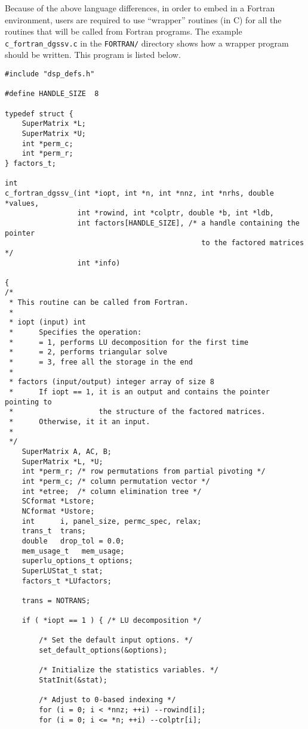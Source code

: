 Because of the above language differences, in order to embed {\superlu}
in a Fortran environment, users are required to use ``wrapper'' routines
(in C) for all the {\superlu} routines that will be called from Fortran
programs. The example {\tt c\_fortran\_dgssv.c} in the {\tt FORTRAN/}
directory shows how a wrapper program should be written.
This program is listed below.

\begin{verbatim}
#include "dsp_defs.h"

#define HANDLE_SIZE  8

typedef struct {
    SuperMatrix *L;
    SuperMatrix *U;
    int *perm_c;
    int *perm_r;
} factors_t;

int
c_fortran_dgssv_(int *iopt, int *n, int *nnz, int *nrhs, double *values,
                 int *rowind, int *colptr, double *b, int *ldb,
                 int factors[HANDLE_SIZE], /* a handle containing the pointer
                                              to the factored matrices */
                 int *info)

{
/* 
 * This routine can be called from Fortran.
 *
 * iopt (input) int
 *      Specifies the operation:
 *      = 1, performs LU decomposition for the first time
 *      = 2, performs triangular solve
 *      = 3, free all the storage in the end
 *
 * factors (input/output) integer array of size 8
 *      If iopt == 1, it is an output and contains the pointer pointing to
 *                    the structure of the factored matrices.
 *      Otherwise, it it an input.
 *
 */
    SuperMatrix A, AC, B;
    SuperMatrix *L, *U;
    int *perm_r; /* row permutations from partial pivoting */
    int *perm_c; /* column permutation vector */
    int *etree;  /* column elimination tree */
    SCformat *Lstore;
    NCformat *Ustore;
    int      i, panel_size, permc_spec, relax;
    trans_t  trans;
    double   drop_tol = 0.0;
    mem_usage_t   mem_usage;
    superlu_options_t options;
    SuperLUStat_t stat;
    factors_t *LUfactors;

    trans = NOTRANS;

    if ( *iopt == 1 ) { /* LU decomposition */

        /* Set the default input options. */
        set_default_options(&options);

        /* Initialize the statistics variables. */
        StatInit(&stat);

        /* Adjust to 0-based indexing */
        for (i = 0; i < *nnz; ++i) --rowind[i];
        for (i = 0; i <= *n; ++i) --colptr[i];


\end{verbatim}
